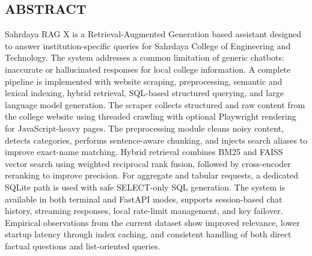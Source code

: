 \documentclass[12pt,a4paper]{report}
\begin{document}
\newpage
{}
\begin{center}
\section*{\Large{\textbf{ABSTRACT}}}
\end{center}
\onehalfspacing
Sahrdaya RAG X is a Retrieval-Augmented Generation based assistant designed to answer institution-specific queries for Sahrdaya College of Engineering and Technology. The system addresses a common limitation of generic chatbots: inaccurate or hallucinated responses for local college information. A complete pipeline is implemented with website scraping, preprocessing, semantic and lexical indexing, hybrid retrieval, SQL-based structured querying, and large language model generation. The scraper collects structured and raw content from the college website using threaded crawling with optional Playwright rendering for JavaScript-heavy pages. The preprocessing module cleans noisy content, detects categories, performs sentence-aware chunking, and injects search aliases to improve exact-name matching. Hybrid retrieval combines BM25 and FAISS vector search using weighted reciprocal rank fusion, followed by cross-encoder reranking to improve precision. For aggregate and tabular requests, a dedicated SQLite path is used with safe SELECT-only SQL generation. The system is available in both terminal and FastAPI modes, supports session-based chat history, streaming responses, local rate-limit management, and key failover. Empirical observations from the current dataset show improved relevance, lower startup latency through index caching, and consistent handling of both direct factual questions and list-oriented queries.

\newpage
\pagestyle{empty}
\begin{center}
\tableofcontents
\end{center}

\newpage
{\setlength{\baselineskip}{1\baselineskip}
\begin{center}
\listoftables
\end{center}
}
\end{document}
